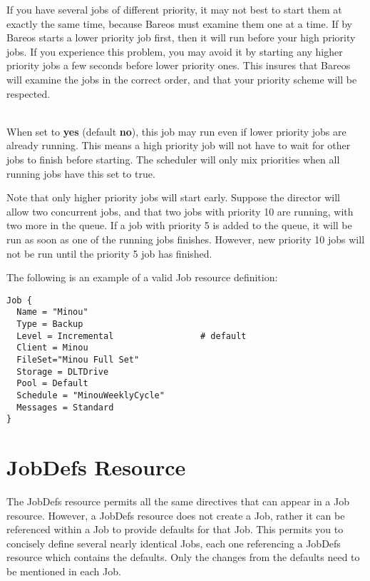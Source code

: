 \begin{description}
If you have several jobs of different priority, it may not best to start
them at exactly the same time, because Bareos must examine them one at a
time.  If by Bareos starts a lower priority job first, then it will run
before your high priority jobs.  If you experience this problem, you may
avoid it by starting any higher priority jobs a few seconds before lower
priority ones.  This insures that Bareos will examine the jobs in the
correct order, and that your priority scheme will be respected.

\label{AllowMixedPriority}
\item [Allow Mixed Priority = {\textless}yes{\textbar}no{\textgreater}] \hfill \\
When
set to {\bf yes} (default {\bf no}), this job may run even if lower
priority jobs are already running.  This means a high priority job
will not have to wait for other jobs to finish before starting.
The scheduler will only mix priorities when all running jobs have
this set to true.

Note that only higher priority jobs will start early.  Suppose the
director will allow two concurrent jobs, and that two jobs with
priority 10 are running, with two more in the queue.  If a job with
priority 5 is added to the queue, it will be run as soon as one of
the running jobs finishes.  However, new priority 10 jobs will not
be run until the priority 5 job has finished.
\end{description}

The following is an example of a valid Job resource definition:

\footnotesize
\begin{verbatim}
Job {
  Name = "Minou"
  Type = Backup
  Level = Incremental                 # default
  Client = Minou
  FileSet="Minou Full Set"
  Storage = DLTDrive
  Pool = Default
  Schedule = "MinouWeeklyCycle"
  Messages = Standard
}
\end{verbatim}
\normalsize

\section{JobDefs Resource}
\label{JobDefsResource}

The JobDefs resource permits all the same directives that can appear in a Job
resource. However, a JobDefs resource does not create a Job, rather it can be
referenced within a Job to provide defaults for that Job. This permits you to
concisely define several nearly identical Jobs, each one referencing a JobDefs
resource which contains the defaults. Only the changes from the defaults need to
be mentioned in each Job.

